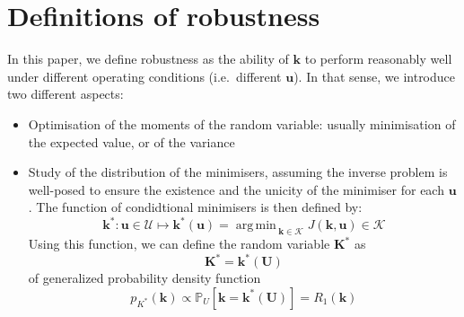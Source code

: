 \documentclass[npg, manuscript]{copernicus}
\DeclareMathOperator*{\argmin}{arg\,min \,}
\newcommand{\Var}{\mathbb{V}\textrm{ar}}
\newcommand{\Ex}{\mathbb{E}}
\newcommand{\Prob}{\mathbb{P}}
\begin{document}
\section{Definitions of robustness}

In this paper, we define robustness as the ability of $\mathbf{k}$ to perform reasonably well under different operating conditions (i.e.\ different $\mathbf{u}$).
In that sense, we introduce two different aspects:
\begin{itemize}
\item Optimisation of the moments of the random variable: usually minimisation of the expected value, or of the variance
\item Study of the distribution of the minimisers, assuming the inverse problem is well-posed to ensure the existence and the unicity of the minimiser for each $\mathbf{u}$. The function of condidtional minimisers is then defined by:
  \begin{equation}
   \mathbf{k}^*: \mathbf{u}\in\mathcal{U} \longmapsto \mathbf{k}^*(\mathbf{u}) = \argmin_{{\mathbf{k}}\in\mathcal{K}} J({\mathbf{k}},\mathbf{u}) \in \mathcal{K}
  \end{equation}
  Using this function, we can define the random variable $\mathbf{K}^*$ as
  \begin{equation}
    \label{eq:def_study_minimisers}
    \mathbf{K}^*= \mathbf{k}^*(\mathbf{U})
  \end{equation}
of generalized probability density function
  \begin{equation}
    \label{eq:def_Kopt_reliability}
    p_{K^*}(\mathbf{k}) \propto \Prob_U\left[\mathbf{k} = \mathbf{k}^*(\mathbf{U})%
    \right] = R_1(\mathbf{k})
  \end{equation}


\end{itemize}
\end{document}
